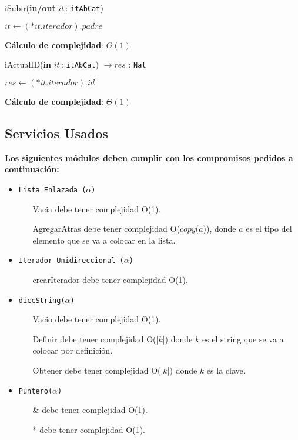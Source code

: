 \documentclass[10pt, a4paper]{article}
\let\TipoVariable=\texttt
\let\ModificadorArgumento=\textbf
\newcommand{\In}[2]{\ModificadorArgumento{in} \ensuremath{#1}\,: \TipoVariable{#2}\xspace}
\newcommand{\Inout}[2]{\ModificadorArgumento{in/out} \ensuremath{#1}\,: \TipoVariable{#2}\xspace}
\newcommand{\DRef}{\ensuremath{\rightarrow}}
\begin{document}
\begin{algorithm}[H]
\caption*{iSubir(\Inout{it}{itAbCat})}
\begin{algorithmic}[1]
	\State $it \gets (*it.iterador).padre$ 
\end{algorithmic}
	\textbf{C\'alculo de complejidad}: $\Theta(1)$
\end{algorithm}

\begin{algorithm}[H]
\caption*{iActualID(\In{it}{itAbCat}) $\DRef res$ : \TipoVariable{Nat}}
\begin{algorithmic}[1]
	\State $res \gets (*it.iterador).id$ 
\end{algorithmic}
	\textbf{C\'alculo de complejidad}: $\Theta(1)$
\end{algorithm}

\subsection{Servicios Usados}

\textbf{Los siguientes m\'odulos deben cumplir con los compromisos pedidos a continuaci\'on:}

\begin{itemize}
	\item \TipoVariable{Lista Enlazada ($\alpha$)}
	\begin{itemize}
		\item[Vacia] debe tener complejidad O(1).
		\item[AgregarAtras] debe tener complejidad O($copy$($a$)), donde $a$ es el tipo del elemento que se va a colocar en la lista.
	\end{itemize}

	\item \TipoVariable{Iterador Unidireccional ($\alpha$)}
	\begin{itemize}
		\item[crearIterador] debe tener complejidad O(1).
	\end{itemize}

	\item \TipoVariable{diccString($\alpha$)}
	\begin{itemize}
		\item[Vacio] debe tener complejidad O(1).
		\item[Definir] debe tener complejidad O(|$k$|) donde $k$ es el string que se va a colocar por definici\'on.
		\item[Obtener] debe tener complejidad O(|$k$|) donde $k$ es la clave.
	\end{itemize}

	\item \TipoVariable{Puntero($\alpha$)}
	\begin{itemize}
		\item[\&] debe tener complejidad O(1).
		\item[*] debe tener complejidad O(1).
	\end{itemize}
\end{itemize}
\end{document}
